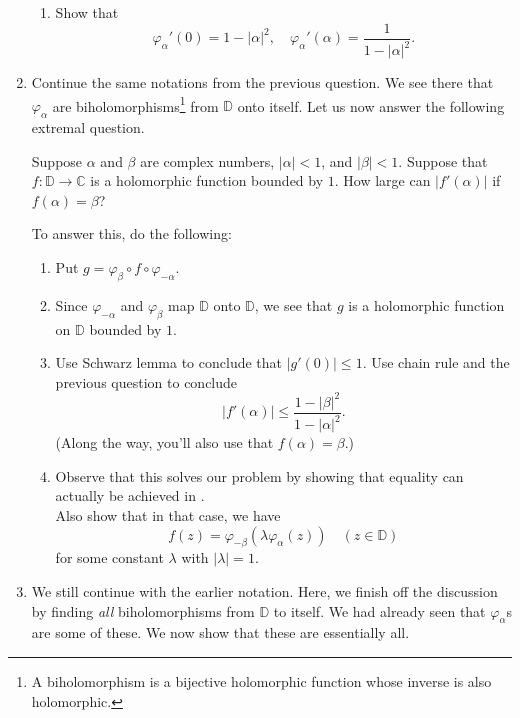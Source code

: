 \documentclass[12pt]{article}
\theoremstyle{definition}
\numberwithin{thm}{section}
\newcommand{\md}[1]{{\left\lvert #1 \right\lvert}}
\newenvironment{blockquote}
{\begin{mdframed}[skipabove=0pt, skipbelow=0pt, innertopmargin=4pt, innerbottommargin=4pt, bottomline=false,topline=false,rightline=false, linewidth=2pt]}
{\end{mdframed}}
\begin{document}
\begin{enumerate}
\begin{enumerate}
		\item Show that
		\begin{equation*} 
			\varphi_{\alpha}'(0) = 1 - \md{\alpha}^2, \quad \varphi_{\alpha}'(\alpha) = \frac{1}{1 - \md{\alpha}^2}.
		\end{equation*}
	\end{enumerate}
	\item Continue the same notations from the previous question. We see there that $\varphi_{\alpha}$ are biholomorphisms\footnote{A biholomorphism is a bijective holomorphic function whose inverse is also holomorphic.} from $\mathbb{D}$ onto itself. Let us now answer the following extremal question. \\
	
	\begin{blockquote}
		Suppose $\alpha$ and $\beta$ are complex numbers, $\md{\alpha} < 1$, and $\md{\beta} < 1$. Suppose that $f : \mathbb{D} \to \mathbb{C}$ is a holomorphic function bounded by $1$. How large can $\md{f'(\alpha)}$ if $f(\alpha) = \beta$?
	\end{blockquote}

	To answer this, do the following:
	\begin{enumerate}
		\item Put $g = \varphi_{\beta} \circ f \circ \varphi_{-\alpha}$.
		\item Since $\varphi_{-\alpha}$ and $\varphi_{\beta}$ map $\mathbb{D}$ onto $\mathbb{D}$, we see that $g$ is a holomorphic function on $\mathbb{D}$ bounded by $1$.
		\item Use Schwarz lemma to conclude that $\md{g'(0)} \le 1$. Use chain rule and the previous question to conclude
		\begin{equation} \label{eq:03}
			\md{f'(\alpha)} \le \frac{1 - \md{\beta}^2}{1 - \md{\alpha}^2}.
		\end{equation}
		(Along the way, you'll also use that $f(\alpha) = \beta$.)
		\item Observe that this solves our problem by showing that equality can actually be achieved in . \\
		Also show that in that case, we have
		\begin{equation*} 
			f(z) = \varphi_{-\beta}(\lambda \varphi_{\alpha}(z)) \quad (z \in \mathbb{D})
		\end{equation*}
		for some constant $\lambda$ with $\md{\lambda} = 1$.
	\end{enumerate}
	\item We still continue with the earlier notation. Here, we finish off the discussion by finding \emph{all} biholomorphisms from $\mathbb{D}$ to itself. We had already seen that $\varphi_{\alpha}$s are some of these. We now show that these are essentially all.


\end{enumerate}
\end{document}
